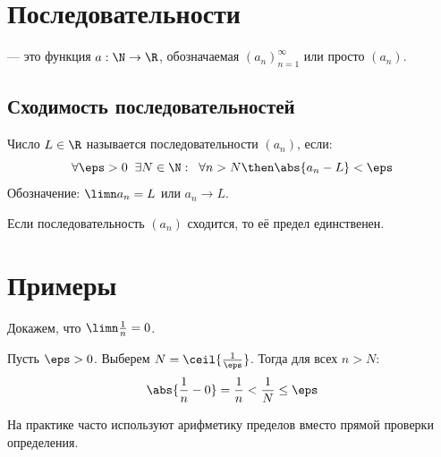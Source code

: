 \section{Последовательности}

\begin{defn}[Последовательность]
 — это функция $a: \N \to \R$, обозначаемая $(a_n)_{n=1}^{\infty}$ или просто $(a_n)$.
\end{defn}

\subsection{Сходимость последовательностей}

\begin{defn}
Число $L \in \R$ называется  последовательности $(a_n)$, если:
\[
    \forall \eps > 0 \;\; \exists N \in \N: \;\; \forall n > N \then \abs{a_n - L} < \eps
\]
Обозначение: $\limn a_n = L$ или $a_n \to L$.
\end{defn}

\begin{thm}
Если последовательность $(a_n)$ сходится, то её предел единственен.
\end{thm}


\section{Примеры}

\begin{example}
Докажем, что $\limn \frac{1}{n} = 0$.

Пусть $\eps > 0$. Выберем $N = \ceil{\frac{1}{\eps}}$. Тогда для всех $n > N$:
\[
    \abs{\frac{1}{n} - 0} = \frac{1}{n} < \frac{1}{N} \leq \eps
\]
\end{example}


\begin{remark}
На практике часто используют арифметику пределов вместо прямой проверки определения.
\end{remark}
